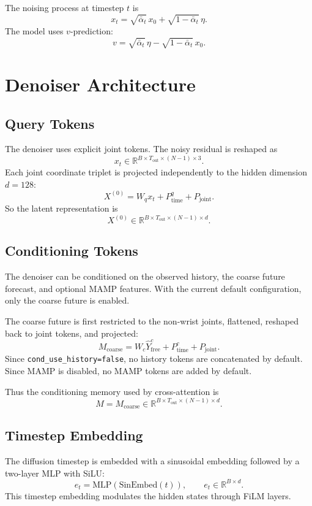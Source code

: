 \documentclass[11pt]{article}
\begin{document}
The noising process at timestep $t$ is
\[
x_t = \sqrt{\bar{\alpha}_t}\,x_0 + \sqrt{1-\bar{\alpha}_t}\,\eta.
\]
The model uses $v$-prediction:
\[
v = \sqrt{\bar{\alpha}_t}\,\eta - \sqrt{1-\bar{\alpha}_t}\,x_0.
\]

\section{Denoiser Architecture}

\subsection{Query Tokens}

The denoiser uses explicit joint tokens. The noisy residual is reshaped as
\[
x_t \in \mathbb{R}^{B \times T_{\mathrm{out}} \times (N-1) \times 3}.
\]
Each joint coordinate triplet is projected independently to the hidden dimension $d=128$:
\[
X^{(0)} = W_q x_t + P_{\mathrm{time}}^{q} + P_{\mathrm{joint}}.
\]
So the latent representation is
\[
X^{(0)} \in \mathbb{R}^{B \times T_{\mathrm{out}} \times (N-1) \times d}.
\]

\subsection{Conditioning Tokens}

The denoiser can be conditioned on the observed history, the coarse future forecast, and optional MAMP features. With the current default configuration, only the coarse future is enabled.

The coarse future is first restricted to the non-wrist joints, flattened, reshaped back to joint tokens, and projected:
\[
M_{\mathrm{coarse}} = W_c \hat{Y}^{c}_{\mathrm{free}} + P_{\mathrm{time}}^{c} + P_{\mathrm{joint}}.
\]
Since \texttt{cond\_use\_history=false}, no history tokens are concatenated by default.
Since MAMP is disabled, no MAMP tokens are added by default.

Thus the conditioning memory used by cross-attention is
\[
M = M_{\mathrm{coarse}}
\in
\mathbb{R}^{B \times T_{\mathrm{out}} \times (N-1) \times d}.
\]

\subsection{Timestep Embedding}

The diffusion timestep is embedded with a sinusoidal embedding followed by a two-layer MLP with SiLU:
\[
e_t = \mathrm{MLP}(\mathrm{SinEmbed}(t)),
\qquad
e_t \in \mathbb{R}^{B \times d}.
\]
This timestep embedding modulates the hidden states through FiLM layers.
\end{document}
